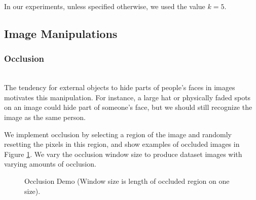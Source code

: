 \documentclass[pageno]{cos429}
\begin{document}
In our experiments, unless specified otherwise, we used the value $k=5$.

\subsection{Image Manipulations}

\subsubsection{Occlusion}\hspace*{\fill} \\
The tendency for external objects to hide parts of people's faces in images motivates this manipulation. For instance, a large hat or physically faded spots on an image could hide part of someone's face, but we should still recognize the image as the same person.

We implement occlusion by selecting a region of the image and randomly resetting the pixels in this region, and show examples of occluded images in Figure \ref{fig:manipulationdemo_occlusion}. We vary the occlusion window size to produce dataset images with varying amounts of occlusion.

\begin{figure}[!htb]
\caption{Occlusion Demo (Window size is length of occluded region on one size).}
\label{fig:manipulationdemo_occlusion}
\end{figure}
\end{document}
